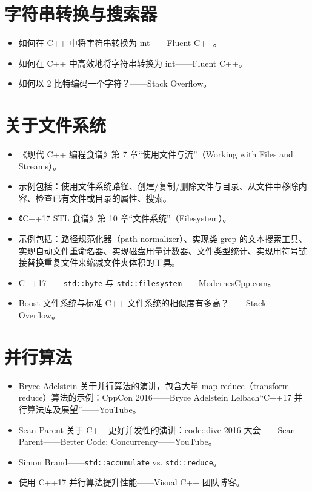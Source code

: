 \section{字符串转换与搜索器}

\begin{itemize}
\item 如何在 C++ 中将字符串转换为 int——Fluent C++。
\item 如何在 C++ 中高效地将字符串转换为 int——Fluent C++。
\item 如何以 2 比特编码一个字符？——Stack Overflow。
\end{itemize}

\section{关于文件系统}

\begin{itemize}
\item 《现代 C++ 编程食谱》第 7 章“使用文件与流”（Working with Files and Streams）。
\item 示例包括：使用文件系统路径、创建/复制/删除文件与目录、从文件中移除内容、检查已有文件或目录的属性、搜索。
\item 《C++17 STL 食谱》第 10 章“文件系统”（Filesystem）。
\item 示例包括：路径规范化器（path normalizer）、实现类 grep 的文本搜索工具、实现自动文件重命名器、实现磁盘用量计数器、文件类型统计、实现用符号链接替换重复文件来缩减文件夹体积的工具。
\item C++17——\texttt{std::byte} 与 \texttt{std::filesystem}——ModernesCpp.com。
\item Boost 文件系统与标准 C++ 文件系统的相似度有多高？——Stack Overflow。
\end{itemize}

\section{并行算法}

\begin{itemize}
\item Bryce Adelstein 关于并行算法的演讲，包含大量 map reduce（transform reduce）算法的示例：CppCon 2016——Bryce Adelstein Lelbach“C++17 并行算法库及展望”——YouTube。
\item Sean Parent 关于 C++ 更好并发性的演讲：code::dive 2016 大会——Sean Parent——Better Code: Concurrency——YouTube。
\item Simon Brand——\texttt{std::accumulate} vs. \texttt{std::reduce}。
\item 使用 C++17 并行算法提升性能——Visual C++ 团队博客。
\end{itemize}
